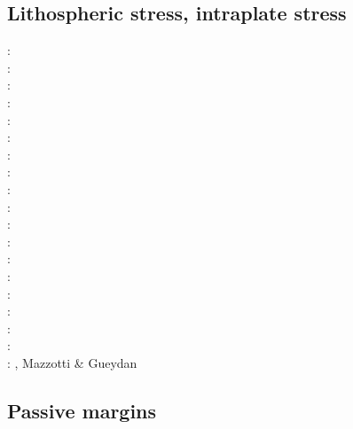 \subsection{Lithospheric stress, intraplate stress}

\begin{scriptsize}
\nineteenseventyfive: \cite{fouy75}\cite{sosr75}\\
\nineteenseventysix: \cite{riss76}\\
\nineteenseventyseven: \cite{chtu77}\\
\nineteenseventynine: \cite{riss79}\\
\nineteeneightynine: \cite{boww89}\\
\nineteenninetyone: \cite{worg91}\\
\nineteenninetytwo: \cite{rich92}\cite{wuvr92}\cite{zoba92}\cite{clko92}\\
\twothousandone: \cite{stsm01}\\
\twothousandfour: \cite{ligu04}\\
\twothousandfive: \cite{timr05}\\
\twothousandseven: \cite{hert07}\\
\twothousandeight: \cite{bilr08}\cite{ghhw08}\\
\twothousandnine: \cite{ghhf09}\cite{nacl09}\\
\twothousandten: \cite{bepo10}\cite{yosh10}\\
\twothousandtwelve: \cite{nalr12}\cite{ghho12}\cite{wagw12}\\
\twothousandthirteen: \cite{ghhw13}\cite{wagw13}\\
\twothousandfourteen: \cite{vagw14}\\
\twothousandseventeen: \cite{grrb17}\\
\twothousandeighteen: \cite{osss18}, Mazzotti \& Gueydan \cite{magu18}
\end{scriptsize}

\subsection{Passive margins} 

